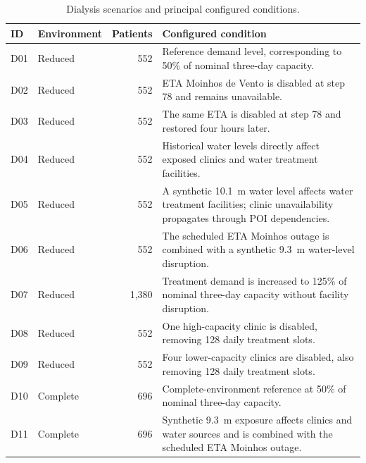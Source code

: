 \begin{table}[ht]
\centering
\footnotesize
\setlength{\tabcolsep}{4pt}
\caption{Dialysis scenarios and principal configured conditions.}
\label{tbl:dialysis_scenarios}
\begin{tabularx}{\linewidth}{@{}llrX@{}}
\toprule
\textbf{ID} &
\textbf{Environment} &
\textbf{Patients} &
\textbf{Configured condition} \\
\midrule

D01 & Reduced & 552
& Reference demand level, corresponding to 50\% of nominal three-day capacity. \\

D02 & Reduced  & 552
& ETA Moinhos de Vento is disabled at step 78 and remains unavailable. \\

D03 & Reduced  & 552
& The same ETA is disabled at step 78 and restored four hours later. \\

D04 & Reduced  & 552
& Historical water levels directly affect exposed clinics and water treatment facilities. \\

D05 & Reduced  & 552
& A synthetic 10.1~m water level affects water treatment facilities; clinic unavailability propagates through POI dependencies. \\

D06 & Reduced  & 552
& The scheduled ETA Moinhos outage is combined with a synthetic 9.3~m water-level disruption. \\

D07 & Reduced  & 1,380
& Treatment demand is increased to 125\% of nominal three-day capacity without facility disruption. \\

D08 & Reduced  & 552
& One high-capacity clinic is disabled, removing 128 daily treatment slots. \\

D09 & Reduced  & 552
& Four lower-capacity clinics are disabled, also removing 128 daily treatment slots. \\

D10 & Complete & 696
& Complete-environment reference at 50\% of nominal three-day capacity. \\

D11 & Complete & 696
& Synthetic 9.3~m exposure affects clinics and water sources and is combined with the scheduled ETA Moinhos outage. \\

\bottomrule
\end{tabularx}
\end{table}

